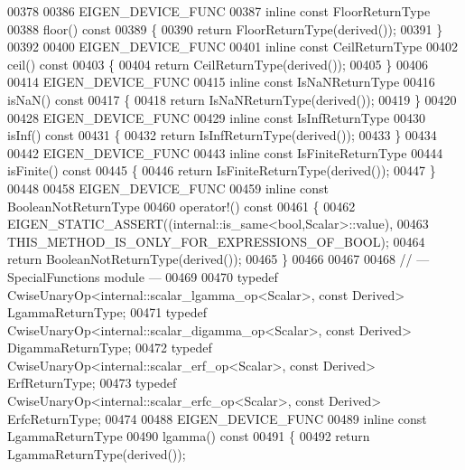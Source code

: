 \begin{DoxyCode}
00378 
00386 EIGEN\_DEVICE\_FUNC
00387 \textcolor{keyword}{inline} \textcolor{keyword}{const} FloorReturnType
00388 floor()\textcolor{keyword}{ const}
00389 \textcolor{keyword}{}\{
00390   \textcolor{keywordflow}{return} FloorReturnType(derived());
00391 \}
00392 
00400 EIGEN\_DEVICE\_FUNC
00401 \textcolor{keyword}{inline} \textcolor{keyword}{const} CeilReturnType
00402 ceil()\textcolor{keyword}{ const}
00403 \textcolor{keyword}{}\{
00404   \textcolor{keywordflow}{return} CeilReturnType(derived());
00405 \}
00406 
00414 EIGEN\_DEVICE\_FUNC
00415 \textcolor{keyword}{inline} \textcolor{keyword}{const} IsNaNReturnType
00416 isNaN()\textcolor{keyword}{ const}
00417 \textcolor{keyword}{}\{
00418   \textcolor{keywordflow}{return} IsNaNReturnType(derived());
00419 \}
00420 
00428 EIGEN\_DEVICE\_FUNC
00429 \textcolor{keyword}{inline} \textcolor{keyword}{const} IsInfReturnType
00430 isInf()\textcolor{keyword}{ const}
00431 \textcolor{keyword}{}\{
00432   \textcolor{keywordflow}{return} IsInfReturnType(derived());
00433 \}
00434 
00442 EIGEN\_DEVICE\_FUNC
00443 \textcolor{keyword}{inline} \textcolor{keyword}{const} IsFiniteReturnType
00444 isFinite()\textcolor{keyword}{ const}
00445 \textcolor{keyword}{}\{
00446   \textcolor{keywordflow}{return} IsFiniteReturnType(derived());
00447 \}
00448 
00458 EIGEN\_DEVICE\_FUNC
00459 \textcolor{keyword}{inline} \textcolor{keyword}{const} BooleanNotReturnType
00460 operator!()\textcolor{keyword}{ const}
00461 \textcolor{keyword}{}\{
00462   EIGEN\_STATIC\_ASSERT((internal::is\_same<bool,Scalar>::value),
00463                       THIS\_METHOD\_IS\_ONLY\_FOR\_EXPRESSIONS\_OF\_BOOL);
00464   \textcolor{keywordflow}{return} BooleanNotReturnType(derived());
00465 \}
00466 
00467 
00468 \textcolor{comment}{// --- SpecialFunctions module ---}
00469 
00470 \textcolor{keyword}{typedef} CwiseUnaryOp<internal::scalar\_lgamma\_op<Scalar>, \textcolor{keyword}{const} Derived> LgammaReturnType;
00471 \textcolor{keyword}{typedef} CwiseUnaryOp<internal::scalar\_digamma\_op<Scalar>, \textcolor{keyword}{const} Derived> DigammaReturnType;
00472 \textcolor{keyword}{typedef} CwiseUnaryOp<internal::scalar\_erf\_op<Scalar>, \textcolor{keyword}{const} Derived> ErfReturnType;
00473 \textcolor{keyword}{typedef} CwiseUnaryOp<internal::scalar\_erfc\_op<Scalar>, \textcolor{keyword}{const} Derived> ErfcReturnType;
00474 
00488 EIGEN\_DEVICE\_FUNC
00489 \textcolor{keyword}{inline} \textcolor{keyword}{const} LgammaReturnType
00490 lgamma()\textcolor{keyword}{ const}
00491 \textcolor{keyword}{}\{
00492   \textcolor{keywordflow}{return} LgammaReturnType(derived());

\end{DoxyCode}
